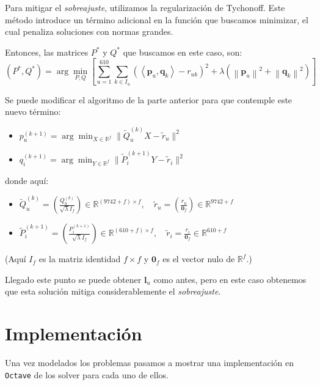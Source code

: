 \documentclass[12pt,a4paper]{article}
\begin{document}
Para mitigar el \textit{sobreajuste}, utilizamos la regularización de Tychonoff. Este método introduce un término adicional en la función que buscamos minimizar, el cual penaliza soluciones con normas grandes.

Entonces, las matrices \(P^*\) y \(Q^*\) que buscamos en este caso, son:
\[
  (P^*, Q^*) = \arg\min_{P, Q}  \left[\sum_{u=1}^{610} \sum_{k \in I_u} (\left\langle \mathbf{p}_u, \mathbf{q}_k \right\rangle - r_{uk})^2 + \lambda(\left\lVert \mathbf{p}_u\right\rVert^2  + \left\lVert \mathbf{q}_k\right\rVert^2 ) \right]
\]

Se puede modificar el algoritmo de la parte anterior para que contemple este nuevo término:

\begin{itemize}
  \item \( p_u^{(k+1)} = \arg\min_{X \in \mathbb{R}^f} \| \tilde{Q}_u^{(k)} X - \tilde{r}_u \|^2 \)
  \item \( q_i^{(k+1)} = \arg\min_{Y \in \mathbb{R}^f} \| \tilde{P}_i^{(k+1)} Y - \tilde{r}_i \|^2 \)
\end{itemize}

donde aquí:

\begin{itemize}
  \item \( \tilde{Q}_u^{(k)} = \left(\frac{Q_u^{(k)}}{\sqrt{\lambda} I_f}\right)  \in \mathbb{R}^{(9742+f) \times f}, \quad \tilde{r}_u = \left(\frac{r_u}{\mathbf{0}_f}\right)  \in \mathbb{R}^{9742+f} \)
  \item \( \tilde{P}_i^{(k+1)} =  \left(\frac{P_i^{(k+1)}}{\sqrt{\lambda} I_f}\right)  \in \mathbb{R}^{(610+f) \times f}, \quad \tilde{r}_i =  \frac{r_i}{\mathbf{0}_f} \in \mathbb{R}^{610+f} \)
\end{itemize}

(Aquí \( I_f \) es la matriz identidad \( f \times f \) y \( \mathbf{0}_f \) es el vector nulo de \( \mathbb{R}^f \).)


Llegado este punto se puede obtener \(\mathbf{l}_u\) como antes, pero en este caso obtenemos que esta solución mitiga considerablemente el \textit{sobreajuste}.

\section*{Implementación}

Una vez modelados los problemas pasamos a mostrar una implementación en \texttt{Octave} de los solver para cada uno de ellos.
\end{document}
